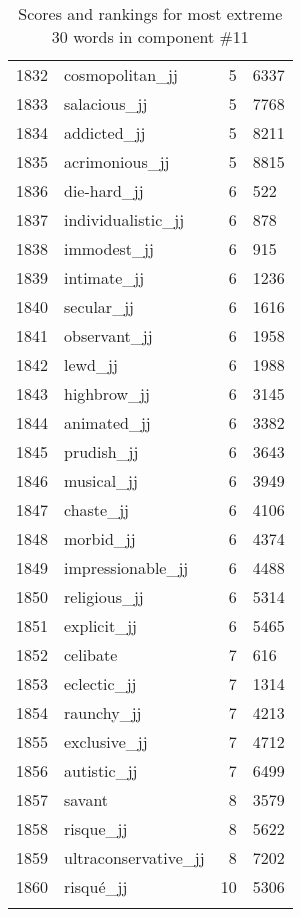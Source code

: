 \begin{longtable}[!htbp]{| rlr@{.}l |}
    1832 & cosmopolitan\_jj & 5 & 6337 \\
    1833 & salacious\_jj & 5 & 7768 \\
    1834 & addicted\_jj & 5 & 8211 \\
    1835 & acrimonious\_jj & 5 & 8815 \\
    1836 & die-hard\_jj & 6 & 522 \\
    1837 & individualistic\_jj & 6 & 878 \\
    1838 & immodest\_jj & 6 & 915 \\
    1839 & intimate\_jj & 6 & 1236 \\
    1840 & secular\_jj & 6 & 1616 \\
    1841 & observant\_jj & 6 & 1958 \\
    1842 & lewd\_jj & 6 & 1988 \\
    1843 & highbrow\_jj & 6 & 3145 \\
    1844 & animated\_jj & 6 & 3382 \\
    1845 & prudish\_jj & 6 & 3643 \\
    1846 & musical\_jj & 6 & 3949 \\
    1847 & chaste\_jj & 6 & 4106 \\
    1848 & morbid\_jj & 6 & 4374 \\
    1849 & impressionable\_jj & 6 & 4488 \\
    1850 & religious\_jj & 6 & 5314 \\
    1851 & explicit\_jj & 6 & 5465 \\
    1852 & celibate & 7 & 616 \\
    1853 & eclectic\_jj & 7 & 1314 \\
    1854 & raunchy\_jj & 7 & 4213 \\
    1855 & exclusive\_jj & 7 & 4712 \\
    1856 & autistic\_jj & 7 & 6499 \\
    1857 & savant & 8 & 3579 \\
    1858 & risque\_jj & 8 & 5622 \\
    1859 & ultraconservative\_jj & 8 & 7202 \\
    1860 & risqué\_jj & 10 & 5306 \\
    \hline
    \caption{Scores and rankings for most extreme 30 words in component \#11} \\
\end{longtable}
